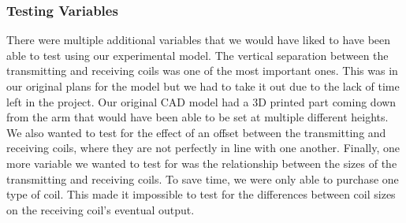 \subsubsection{Testing Variables}
There were multiple additional variables that we would have liked to have been able to test using 
our experimental model. The vertical separation between the transmitting and receiving coils was 
one of the most important ones. This was in our original plans for the model but we had to take it 
out due to the lack of time left in the project. Our original CAD model had a 3D printed part coming 
down from the arm that would have been able to be set at multiple different heights. We also wanted to 
test for the effect of an offset between the transmitting and receiving coils, where they are not perfectly 
in line with one another. Finally, one more variable we wanted to test for was the relationship between 
the sizes of the transmitting and receiving coils. To save time, we were only able to purchase one type of coil. 
This made it impossible to test for the differences between coil sizes on the receiving coil’s eventual output. 